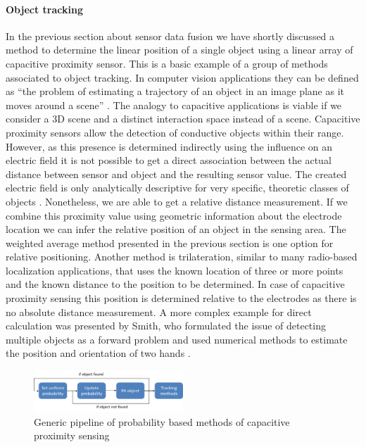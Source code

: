 \paragraph{Object tracking}
In the previous section about sensor data fusion we have shortly discussed a method to determine the linear position of a single object using a linear array of capacitive proximity sensor. This is a basic example of a group of methods associated to object tracking. In computer vision applications they can be defined as “the problem of estimating a trajectory of an object in an image plane as it moves around a scene” \cite{yilmaz2006object}. The analogy to capacitive applications is viable if we consider a 3D scene and a distinct interaction space instead of a scene. 
Capacitive proximity sensors allow the detection of conductive objects within their range. However, as this presence is determined indirectly using the influence on an electric field it is not possible to get a direct association between the actual distance between sensor and object and the resulting sensor value. The created electric field is only analytically descriptive for very specific, theoretic classes of objects \cite{Baxter1996}. Nonetheless, we are able to get a relative distance measurement. If we combine this proximity value using geometric information about the electrode location we can infer the relative position of an object in the sensing area. The weighted average method presented in the previous section is one option for relative positioning. Another method is trilateration, similar to many radio-based localization applications, that uses the known location of three or more points and the known distance to the position to be determined. In case of capacitive proximity sensing this position is determined relative to the electrodes as there is no absolute distance measurement. 
A more complex example for direct calculation was presented by Smith, who formulated the issue of detecting multiple objects as a forward problem and used numerical methods to estimate the position and orientation of two hands \cite{smith1999thesis}.
\begin{figure}[h]
\centering
\includegraphics[width=0.5\textwidth]{images/prob_methods}
\caption{Generic pipeline of probability based methods of capacitive proximity sensing}
\label{fig:rel_prob_method}
\end{figure}

